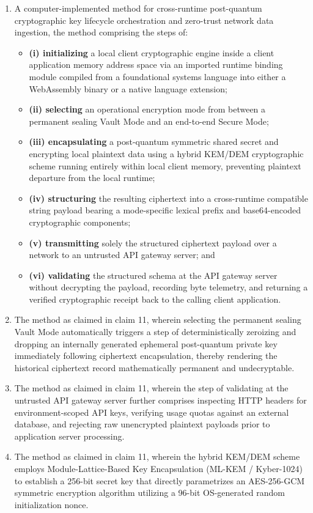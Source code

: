 \documentclass[12pt, a4paper]{article}
\begin{document}
\begin{enumerate}
    \item A computer-implemented method for cross-runtime post-quantum cryptographic key lifecycle orchestration and zero-trust network data ingestion, the method comprising the steps of:
    \begin{itemize}
        \item \textbf{(i) initializing} a local client cryptographic engine inside a client application memory address space via an imported runtime binding module compiled from a foundational systems language into either a WebAssembly binary or a native language extension;
        \item \textbf{(ii) selecting} an operational encryption mode from between a permanent sealing Vault Mode and an end-to-end Secure Mode;
        \item \textbf{(iii) encapsulating} a post-quantum symmetric shared secret and encrypting local plaintext data using a hybrid KEM/DEM cryptographic scheme running entirely within local client memory, preventing plaintext departure from the local runtime;
        \item \textbf{(iv) structuring} the resulting ciphertext into a cross-runtime compatible string payload bearing a mode-specific lexical prefix and base64-encoded cryptographic components;
        \item \textbf{(v) transmitting} solely the structured ciphertext payload over a network to an untrusted API gateway server; and
        \item \textbf{(vi) validating} the structured schema at the API gateway server without decrypting the payload, recording byte telemetry, and returning a verified cryptographic receipt back to the calling client application.
    \end{itemize}
    
    \item The method as claimed in claim 11, wherein selecting the permanent sealing Vault Mode automatically triggers a step of deterministically zeroizing and dropping an internally generated ephemeral post-quantum private key immediately following ciphertext encapsulation, thereby rendering the historical ciphertext record mathematically permanent and undecryptable.
    
    \item The method as claimed in claim 11, wherein the step of validating at the untrusted API gateway server further comprises inspecting HTTP headers for environment-scoped API keys, verifying usage quotas against an external database, and rejecting raw unencrypted plaintext payloads prior to application server processing.
    
    \item The method as claimed in claim 11, wherein the hybrid KEM/DEM scheme employs Module-Lattice-Based Key Encapsulation (ML-KEM / Kyber-1024) to establish a 256-bit secret key that directly parametrizes an AES-256-GCM symmetric encryption algorithm utilizing a 96-bit OS-generated random initialization nonce.
\end{enumerate}
\end{document}
